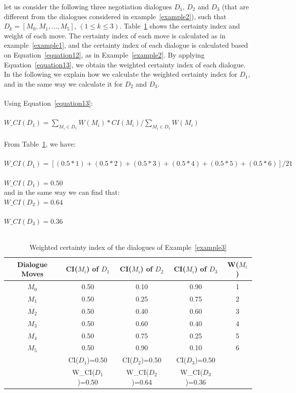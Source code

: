 \begin{example}\label{example3}
let us consider the following three negotiation dialogues $D_1$, $D_2$ and $D_3$ (that are different from the dialogues considered
in example~\ref{example2}), such that $D_k=[M_0,M_1,\ldots,M_5]$, $(1 \leq k \leq 3)$. Table~\ref{Table3} shows the certainty index
and weight of each move. The certainty index of each move is calculated as in example~\ref{example1}, and the certainty index of each
dialogue is calculated based on Equation~\ref{equation12}, as in Example~\ref{example2}. By applying Equation~\ref{equation13}, we obtain
the weighted certainty index of each dialogue. In the following we explain how we calculate the weighted certainty index for $D_1$, and
in the same way we calculate it for $D_2$ and $D_3$.
%
\\\\ Using Equation~\ref{equation13}: \\
\\ $W\_CI(D_1)=\sum_{M_i\in D_1}{W(M_i)*CI(M_i)}/\sum_{M_i\in D_1}W(M_i)$\\
\\From Table~\ref{Table3}, we have:\\
\\ $W\_CI(D_1)= [(0.5*1)+(0.5*2)+(0.5*3)+(0.5*4)+(0.5*5)+(0.5*6)]/21 $\\
\\ $W\_CI(D_1)= 0.50 $\\
and in the same way we can find that:
\\ $W\_CI(D_2)= 0.64 $\\
\\ $W\_CI(D_3)= 0.36 $\\\\
%
\begin{table}[tbp]
\centering \caption{Weighted certainty index of the dialogues of Example~\ref{example3}} \label{Table3}
\begin{tabular}{ccccc}\hline
\textbf{Dialogue Moves}&\textbf{CI($M_i$) of $D_1$}&\textbf{CI($M_i$) of $D_2$}&\textbf{CI($M_i$) of $D_3$}&\textbf{W($M_i$)}\\
\hline
{$M_0$} & {0.50} & {0.10} & {0.90} &  {1} \\
{$M_1$} & {0.50} & {0.25} & {0.75} &  {2} \\
{$M_2$} & {0.50} & {0.40} & {0.60} &  {3} \\
{$M_3$} & {0.50} & {0.60} & {0.40} &  {4} \\
{$M_4$} & {0.50} & {0.75} & {0.25} &  {5} \\
{$M_5$} & {0.50} & {0.90} & {0.10} &  {6} \\
\hline
 & {CI($D_1$)=0.50} & {CI($D_2$)=0.50} & {CI($D_3$)=0.50} \\
 & {W\_CI($D_1$)=0.50} & {W\_CI($D_2$)=0.64} & {W\_CI($D_3$)=0.36} \\
\hline
\end{tabular}
\end{table}


\end{example}
